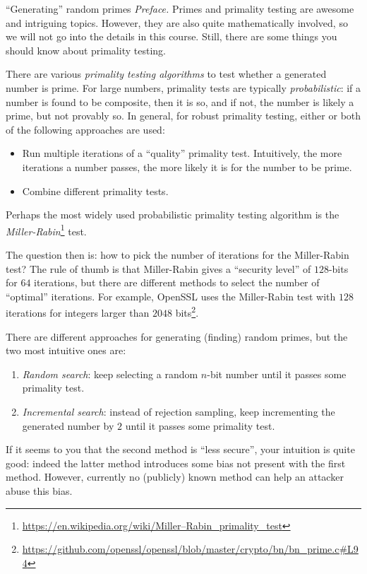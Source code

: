 \documentclass{practice}
\begin{document}
\begin{task}{\enquote{Generating} random primes}
  \textit{Preface.}
  Primes and primality testing are awesome and intriguing topics.
  However, they are also quite mathematically involved, so we will not go into the details in this course.
  Still, there are some things you should know about primality testing.

  There are various \emph{primality testing algorithms} to test whether a generated number is prime.
  For large numbers, primality tests are typically \emph{probabilistic}: if a number is found to be composite, then it is so, and if not, the number is likely a prime, but not provably so.
  In general, for robust primality testing, either or both of the following approaches are used:
  \begin{itemize}
    \item Run multiple iterations of a \enquote{quality} primality test.
    Intuitively, the more iterations a number passes, the more likely it is for the number to be prime.
    \item Combine different primality tests.
  \end{itemize}

  Perhaps the most widely used probabilistic primality testing algorithm is the \emph{Miller-Rabin}\footnote{\url{https://en.wikipedia.org/wiki/Miller–Rabin_primality_test}} test.
  
  The question then is: how to pick the number of iterations for the Miller-Rabin test?
  The rule of thumb is that Miller-Rabin gives a \enquote{security level} of $128$-bits for $64$ iterations, but there are different methods to select the number of \enquote{optimal} iterations.
  For example, OpenSSL uses the Miller-Rabin test with $128$ iterations for integers larger than $2048$ bits\footnote{\url{https://github.com/openssl/openssl/blob/master/crypto/bn/bn_prime.c\#L94}}.

  There are different approaches for generating (finding) random primes, but the two most intuitive ones are:
  \begin{enumerate}
    \item \emph{Random search}: keep selecting a random $n$-bit number until it passes some primality test.
    \item \emph{Incremental search}: instead of rejection sampling, keep incrementing the generated number by $2$ until it passes some primality test.
  \end{enumerate}

  If it seems to you that the second method is \enquote{less secure}, your intuition is quite good: indeed the latter method introduces some bias not present with the first method.
  However, currently no (publicly) known method can help an attacker abuse this bias.


\end{task}
\end{document}
